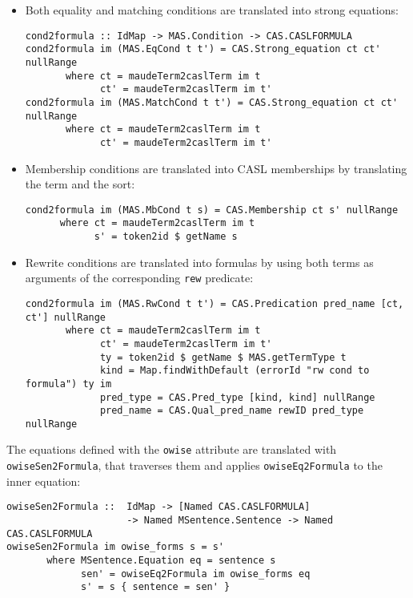 \begin{itemize}

\item Both equality and matching conditions are translated into
strong equations:

{\codesize
\begin{verbatim}
cond2formula :: IdMap -> MAS.Condition -> CAS.CASLFORMULA
cond2formula im (MAS.EqCond t t') = CAS.Strong_equation ct ct' nullRange
       where ct = maudeTerm2caslTerm im t
             ct' = maudeTerm2caslTerm im t'
cond2formula im (MAS.MatchCond t t') = CAS.Strong_equation ct ct' nullRange
       where ct = maudeTerm2caslTerm im t
             ct' = maudeTerm2caslTerm im t'
\end{verbatim}
}

\item Membership conditions are translated into CASL memberships by translating
the term and the sort:

{\codesize
\begin{verbatim}
cond2formula im (MAS.MbCond t s) = CAS.Membership ct s' nullRange
      where ct = maudeTerm2caslTerm im t
            s' = token2id $ getName s
\end{verbatim}
}

\item Rewrite conditions are translated into formulas by using both terms
as arguments of the corresponding \verb"rew" predicate: 

{\codesize
\begin{verbatim}
cond2formula im (MAS.RwCond t t') = CAS.Predication pred_name [ct, ct'] nullRange
       where ct = maudeTerm2caslTerm im t
             ct' = maudeTerm2caslTerm im t'
             ty = token2id $ getName $ MAS.getTermType t
             kind = Map.findWithDefault (errorId "rw cond to formula") ty im
             pred_type = CAS.Pred_type [kind, kind] nullRange
             pred_name = CAS.Qual_pred_name rewID pred_type nullRange
\end{verbatim}
}

\end{itemize}

The equations defined with the \verb"owise" attribute are translated
with \verb"owiseSen2Formula", that traverses them and applies
\verb"owiseEq2Formula" to the inner equation:

{\codesize
\begin{verbatim}
owiseSen2Formula ::  IdMap -> [Named CAS.CASLFORMULA]
                     -> Named MSentence.Sentence -> Named CAS.CASLFORMULA
owiseSen2Formula im owise_forms s = s'
       where MSentence.Equation eq = sentence s
             sen' = owiseEq2Formula im owise_forms eq
             s' = s { sentence = sen' }
\end{verbatim}
}

